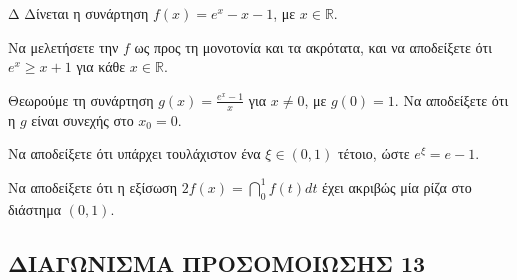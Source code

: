 \begin{thema}{Δ}
Δίνεται η συνάρτηση $f(x)=e^x-x-1$, με $x\in\mathbb{R}$.
\begin{erwthma}
    \item Να μελετήσετε την $f$ ως προς τη μονοτονία και τα ακρότατα, και να αποδείξετε ότι $e^x \geq x+1$ για κάθε $x\in\mathbb{R}$. 
    \item Θεωρούμε τη συνάρτηση $g(x) = \frac{e^x-1}{x}$ για $x\neq 0$, με $g(0)=1$. Να αποδείξετε ότι η $g$ είναι συνεχής στο $x_0 = 0$. 
    \item Να αποδείξετε ότι υπάρχει τουλάχιστον ένα $\xi\in(0,1)$ τέτοιο, ώστε $e^\xi = e-1$. 
    \item Να αποδείξετε ότι η εξίσωση $2f(x) = \dint_0^1 f(t)dt$ έχει ακριβώς μία ρίζα στο διάστημα $(0,1)$. 
\end{erwthma}
\end{thema}

\newpage
\subsection{ΔΙΑΓΩΝΙΣΜΑ ΠΡΟΣΟΜΟΙΩΣΗΣ 13}

